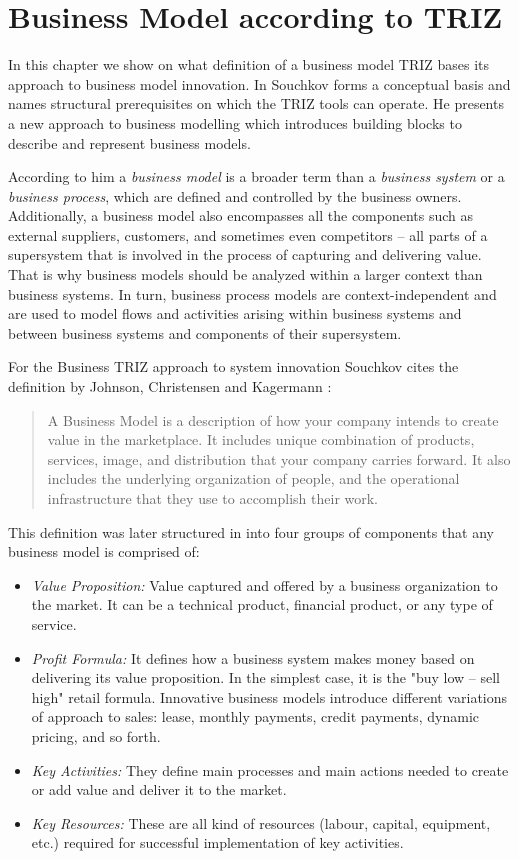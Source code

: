 \documentclass[11pt,a4paper]{article}
\begin{document}
\section{Business Model according to TRIZ}

In this chapter we show on what definition of a business model TRIZ bases its
approach to business model innovation. In \cite{6} Souchkov forms a conceptual
basis and names structural prerequisites on which the TRIZ tools can operate.
He presents a new approach to business modelling which introduces building
blocks to describe and represent business models.

According to him a \emph{business model} is a broader term than a
\emph{business system} or a \emph{business process}, which are defined and
controlled by the business owners. Additionally, a business model also
encompasses all the components such as external suppliers, customers, and
sometimes even competitors – all parts of a supersystem that is involved in
the process of capturing and delivering value. That is why business models
should be analyzed within a larger context than business systems. In turn,
business process models are context-independent and are used to model flows
and activities arising within business systems and between business systems
and components of their supersystem.

For the Business TRIZ approach to system innovation Souchkov cites the
definition by Johnson, Christensen and Kagermann \cite{12}:
\begin{quote}
  A Business Model is a description of how your company intends to create
  value in the marketplace. It includes unique combination of products,
  services, image, and distribution that your company carries forward. It also
  includes the underlying organization of people, and the operational
  infrastructure that they use to accomplish their work.
\end{quote}
This definition was later structured in \cite{12} into four groups of
components that any business model is comprised of:
\begin{itemize}
\item \emph{Value Proposition:} Value captured and offered by a business
  organization to the market. It can be a technical product, financial
  product, or any type of service.
\item \emph{Profit Formula:} It defines how a business system makes money
  based on delivering its value proposition. In the simplest case, it is the
  "buy low -- sell high" retail formula. Innovative business models introduce
  different variations of approach to sales: lease, monthly payments, credit
  payments, dynamic pricing, and so forth.
\item \emph{Key Activities:} They define main processes and main actions
  needed to create or add value and deliver it to the market.
\item \emph{Key Resources:} These are all kind of resources (labour, capital,
  equipment, etc.) required for successful implementation of key activities.
\end{itemize}
\end{document}
